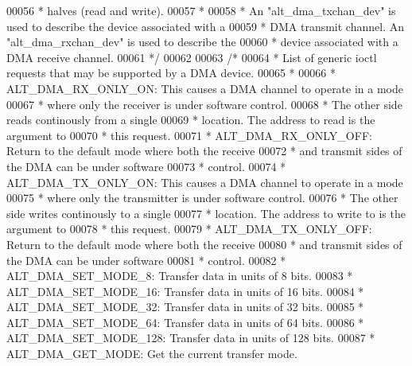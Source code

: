 \begin{DoxyCode}
00056 \textcolor{comment}{ * halves (read and write). }
00057 \textcolor{comment}{ *}
00058 \textcolor{comment}{ * An "alt\_dma\_txchan\_dev" is used to describe the device associated with a}
00059 \textcolor{comment}{ * DMA transmit channel. An "alt\_dma\_rxchan\_dev" is used to describe the}
00060 \textcolor{comment}{ * device associated with a DMA receive channel. }
00061 \textcolor{comment}{ */}
00062 
00063 \textcolor{comment}{/*}
00064 \textcolor{comment}{ * List of generic ioctl requests that may be supported by a DMA device.}
00065 \textcolor{comment}{ *}
00066 \textcolor{comment}{ * ALT\_DMA\_RX\_ONLY\_ON:    This causes a DMA channel to operate in a mode}
00067 \textcolor{comment}{ *                        where only the receiver is under software control.}
00068 \textcolor{comment}{ *                        The other side reads continously from a single}
00069 \textcolor{comment}{ *                        location. The address to read is the argument to}
00070 \textcolor{comment}{ *                        this request.}
00071 \textcolor{comment}{ * ALT\_DMA\_RX\_ONLY\_OFF:   Return to the default mode where both the receive}
00072 \textcolor{comment}{ *                        and transmit sides of the DMA can be under software}
00073 \textcolor{comment}{ *                        control.}
00074 \textcolor{comment}{ * ALT\_DMA\_TX\_ONLY\_ON:    This causes a DMA channel to operate in a mode}
00075 \textcolor{comment}{ *                        where only the transmitter is under software control.}
00076 \textcolor{comment}{ *                        The other side writes continously to a single}
00077 \textcolor{comment}{ *                        location. The address to write to is the argument to}
00078 \textcolor{comment}{ *                        this request.}
00079 \textcolor{comment}{ * ALT\_DMA\_TX\_ONLY\_OFF:   Return to the default mode where both the receive}
00080 \textcolor{comment}{ *                        and transmit sides of the DMA can be under software}
00081 \textcolor{comment}{ *                        control.}
00082 \textcolor{comment}{ * ALT\_DMA\_SET\_MODE\_8:    Transfer data in units of 8 bits.}
00083 \textcolor{comment}{ * ALT\_DMA\_SET\_MODE\_16:   Transfer data in units of 16 bits.}
00084 \textcolor{comment}{ * ALT\_DMA\_SET\_MODE\_32:   Transfer data in units of 32 bits.}
00085 \textcolor{comment}{ * ALT\_DMA\_SET\_MODE\_64:   Transfer data in units of 64 bits.}
00086 \textcolor{comment}{ * ALT\_DMA\_SET\_MODE\_128:  Transfer data in units of 128 bits.}
00087 \textcolor{comment}{ * ALT\_DMA\_GET\_MODE:      Get the current transfer mode.}

\end{DoxyCode}
